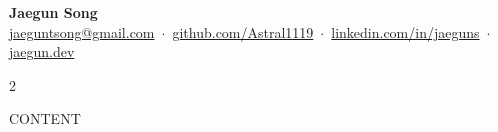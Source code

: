 \documentclass[11pt,letterpaper]{article}
\begin{document}
\begin{center}
{\Large\textbf{Jaegun Song}}\\[2pt]
\small
\href{mailto:jaeguntsong@gmail.com}{jaeguntsong@gmail.com} \,$\cdot$\, 
\href{https://github.com/Astral1119}{github.com/Astral1119} \,$\cdot$\, 
\href{https://linkedin.com/in/jaeguns}{linkedin.com/in/jaeguns} \,$\cdot$\, 
\href{https://jaegun.dev}{jaegun.dev}
\end{center}

\vspace{-6pt}

\begin{multicols}{2}

CONTENT

\end{multicols}
\end{document}
